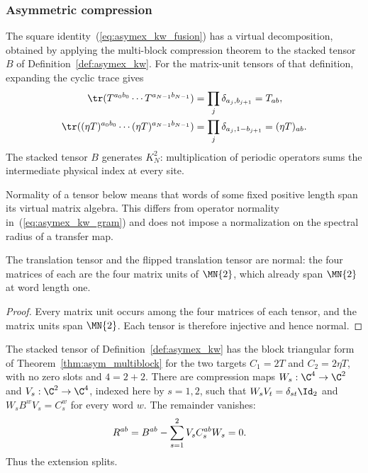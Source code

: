 \subsubsection{Asymmetric compression}

The square identity~(\ref{eq:asymex_kw_fusion}) has a virtual
decomposition, obtained by applying the multi-block compression
theorem to the stacked tensor $B$ of Definition~\ref{def:asymex_kw}.
For the matrix-unit tensors of that definition, expanding the cyclic
trace gives
\begin{align}
    \tr(T^{a_0b_0}\cdots T^{a_{N-1}b_{N-1}})
     & =\prod_j\delta_{a_j,b_{j+1}}=T_{ab},
    \notag                                           \\
    \tr((\eta T)^{a_0b_0}\cdots(\eta T)^{a_{N-1}b_{N-1}})
     & =\prod_j\delta_{a_j,1-b_{j+1}}=(\eta T)_{ab}.
    \notag
\end{align}
The stacked tensor $B$ generates $K_N^2$: multiplication of periodic
operators sums the intermediate physical index at every site.

Normality of a tensor below means that words of some fixed
positive length span its virtual matrix algebra. This differs from
operator normality in~(\ref{eq:asymex_kw_gram}) and does not impose a
normalization on the spectral radius of a transfer map.

\begin{lemma}
    \label{thm:asymex_kw_normal}
    \leanok
    The translation tensor and the flipped translation tensor are normal:
    the four matrices of each are the four matrix units of $\MN{2}$, which
    already span $\MN{2}$ at word length one.
\end{lemma}

\begin{proof}
    \leanok
    Every matrix unit occurs among the four matrices of each tensor, and
    the matrix units span $\MN{2}$. Each tensor is therefore injective
    and hence normal.
\end{proof}

\begin{lemma}
    \label{thm:asymex_kw_compression}
    \leanok
    The stacked tensor of Definition~\ref{def:asymex_kw} has the block
    triangular form of Theorem~\ref{thm:asym_multiblock} for the two
    targets $C_1=2T$ and $C_2=2\eta T$, with no zero slots and $4=2+2$.
    There are compression maps $W_s:\C^4\to\C^2$ and
    $V_s:\C^2\to\C^4$, indexed here by $s=1,2$, such that
    $W_sV_t=\delta_{st}\Id_2$ and $W_sB^wV_s=C_s^w$ for every word $w$.
    The remainder vanishes:
    \begin{align}
        R^{ab} & =B^{ab}-\sum_{s=1}^2V_sC_s^{ab}W_s=0.
        \notag
    \end{align}
    Thus the extension splits.
\end{lemma}

